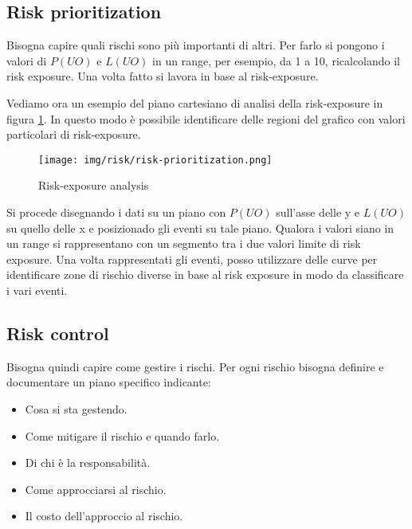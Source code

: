 \subsection{Risk prioritization}
Bisogna capire quali rischi sono più importanti di altri. Per farlo si pongono i
valori di $P(UO)$ e $L(UO)$ in un range, per esempio, da 1 a 10, ricalcolando il
risk exposure. Una volta fatto si lavora in base al risk-exposure.
\begin{esempio}
    Vediamo ora un esempio del piano cartesiano di analisi della risk-exposure in
    figura \ref{fig:risk-exposure-analysis}. In questo modo è possibile identificare
    delle regioni del grafico con valori particolari di risk-exposure.
    \begin{figure}[!ht]
        \centering
        \texttt{[image: img/risk/risk-prioritization.png]}
        \caption{Risk-exposure analysis}
        \label{fig:risk-exposure-analysis}
    \end{figure}
\end{esempio}
Si procede disegnando i dati su un piano con $P(UO)$ sull'asse delle y e $L(UO)$
su quello delle x e posizionado gli eventi su tale piano. Qualora i valori siano
in un range si rappresentano con un segmento tra i due valori limite di risk exposure.
Una volta rappresentati gli eventi, posso utilizzare delle curve per identificare
zone di rischio diverse in base al risk exposure in modo da classificare i vari eventi.
\subsection{Risk control}
Bisogna quindi capire come gestire i rischi. Per ogni rischio bisogna definire e
documentare un piano specifico indicante:
\begin{itemize}
    \item Cosa si sta gestendo.
    \item Come mitigare il rischio e quando farlo.
    \item Di chi è la responsabilità.
    \item Come approcciarsi al rischio.
    \item Il costo dell'approccio al rischio.
\end{itemize}

